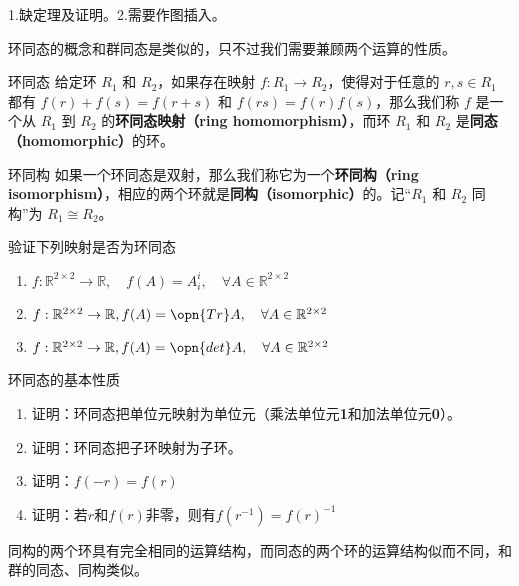 
\begin{issues}
\issueDraft 
1.缺定理及证明。2.需要作图插入。
\end{issues}


环同态的概念和群同态是类似的，只不过我们需要兼顾两个运算的性质。


\begin{definition}{环同态}
给定环 $R_1$ 和 $R_2$，如果存在映射 $f:R_1\rightarrow R_2$，使得对于任意的 $r, s\in R_1$ 都有 $f(r)+f(s)=f(r+s)$ 和 $f(rs)=f(r)f(s)$，那么我们称 $f$ 是一个从 $R_1$ 到 $R_2$ 的\textbf{环同态映射（ring homomorphism）}，而环 $R_1$ 和 $R_2$ 是\textbf{同态（homomorphic）}的环。
\end{definition}

\begin{definition}{环同构}
如果一个环同态是双射，那么我们称它为一个\textbf{环同构（ring isomorphism）}，相应的两个环就是\textbf{同构（isomorphic）}的。记“$R_1$ 和 $R_2$ 同构”为 $R_1\cong R_2$。
\end{definition}
\begin{exercise}{验证下列映射是否为环同态}
\begin{enumerate}
\item $f:\mathbb R^{2\times 2}\rightarrow \mathbb R,\quad f(A)=A^i_i,\quad \forall A\in \mathbb R^{2\times 2}$
\item $f:\mathbb R^{2\times 2}\rightarrow \mathbb R,f(A)=\opn {Tr}A,\quad \forall A\in \mathbb R^{2\times 2}$
\item $f:\mathbb R^{2\times 2}\rightarrow \mathbb R,f(A)=\opn {det}A,\quad \forall A\in \mathbb R^{2\times 2}$
\end{enumerate}
\end{exercise}
\begin{exercise}{环同态的基本性质}
\begin{enumerate}
\item 证明：环同态把单位元映射为单位元（乘法单位元\textbf{1}和加法单位元\textbf{0}）。
\item 证明：环同态把子环映射为子环。
\item 证明：$f(-r)=f(r)$
\item 证明：若$r$和$f(r)$非零，则有$f(r^{-1})=f(r)^{-1}$
\end{enumerate}
\end{exercise}
同构的两个环具有完全相同的运算结构，而同态的两个环的运算结构似而不同，和群的同态、同构类似。

